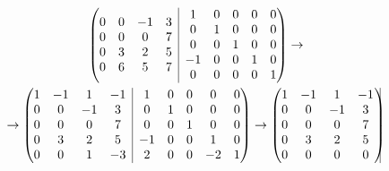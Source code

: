 \documentclass[11pt,a4paper]{article}
\newcommand{\rvline}{\hspace*{-\arraycolsep}\vline\hspace*{-\arraycolsep}}
\begin{document}
\begin{enumerate}
\begin{enumerate}
\begin{multline*}
\begin{pmatrix}
\begin{matrix}
            0 & 0 & -1 & 3 \\
            0 & 0 & 0 & 7 \\
            0 & 3 & 2 & 5 \\
            0 & 6 & 5 & 7 \\
            \end{matrix} & \rvline & \begin{matrix}
            1 & 0 & 0 & 0 & 0  \\
            0 & 1 & 0 & 0 & 0  \\
            0 & 0 & 1 & 0 & 0  \\
            -1 & 0 & 0 & 1 & 0  \\
            0 & 0 & 0 & 0 & 1 \\
            \end{matrix}
            \end{pmatrix}\rightarrow \\ \rightarrow\begin{pmatrix}
            \begin{matrix}
            1 & -1 & 1 & -1 \\
            0 & 0 & -1 & 3 \\
            0 & 0 & 0 & 7 \\
            0 & 3 & 2 & 5 \\
            0 & 0 & 1 & -3 \\
            \end{matrix} & \rvline & \begin{matrix}
            1 & 0 & 0 & 0 & 0  \\
            0 & 1 & 0 & 0 & 0  \\
            0 & 0 & 1 & 0 & 0  \\
            -1 & 0 & 0 & 1 & 0  \\
            2 & 0 & 0 & -2 & 1 \\
            \end{matrix}
            \end{pmatrix}\rightarrow\begin{pmatrix}
            \begin{matrix}
            1 & -1 & 1 & -1 \\
            0 & 0 & -1 & 3 \\
            0 & 0 & 0 & 7 \\
            0 & 3 & 2 & 5 \\
            0 & 0 & 0 & 0 \\
            \end{matrix} & \rvline & \begin{matrix}

\end{matrix}
\end{pmatrix}
\end{multline*}
\end{enumerate}
\end{enumerate}
\end{document}
